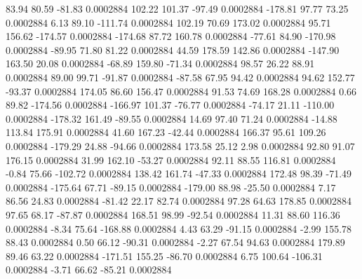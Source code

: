       83.94       80.59      -81.83     0.0002884
      102.22      101.37      -97.49     0.0002884
     -178.81       97.77       73.25     0.0002884
        6.13       89.10     -111.74     0.0002884
      102.19       70.69      173.02     0.0002884
       95.71      156.62     -174.57     0.0002884
     -174.68       87.72      160.78     0.0002884
      -77.61       84.90     -170.98     0.0002884
      -89.95       71.80       81.22     0.0002884
       44.59      178.59      142.86     0.0002884
     -147.90      163.50       20.08     0.0002884
      -68.89      159.80      -71.34     0.0002884
       98.57       26.22       88.91     0.0002884
       89.00       99.71      -91.87     0.0002884
      -87.58       67.95       94.42     0.0002884
       94.62      152.77      -93.37     0.0002884
      174.05       86.60      156.47     0.0002884
       91.53       74.69      168.28     0.0002884
        0.66       89.82     -174.56     0.0002884
     -166.97      101.37      -76.77     0.0002884
      -74.17       21.11     -110.00     0.0002884
     -178.32      161.49      -89.55     0.0002884
       14.69       97.40       71.24     0.0002884
      -14.88      113.84      175.91     0.0002884
       41.60      167.23      -42.44     0.0002884
      166.37       95.61      109.26     0.0002884
     -179.29       24.88      -94.66     0.0002884
      173.58       25.12        2.98     0.0002884
       92.80       91.07      176.15     0.0002884
       31.99      162.10      -53.27     0.0002884
       92.11       88.55      116.81     0.0002884
       -0.84       75.66     -102.72     0.0002884
      138.42      161.74      -47.33     0.0002884
      172.48       98.39      -71.49     0.0002884
     -175.64       67.71      -89.15     0.0002884
     -179.00       88.98      -25.50     0.0002884
        7.17       86.56       24.83     0.0002884
      -81.42       22.17       82.74     0.0002884
       97.28       64.63      178.85     0.0002884
       97.65       68.17      -87.87     0.0002884
      168.51       98.99      -92.54     0.0002884
       11.31       88.60      116.36     0.0002884
       -8.34       75.64     -168.88     0.0002884
        4.43       63.29      -91.15     0.0002884
       -2.99      155.78       88.43     0.0002884
        0.50       66.12      -90.31     0.0002884
       -2.27       67.54       94.63     0.0002884
      179.89       89.46       63.22     0.0002884
     -171.51      155.25      -86.70     0.0002884
        6.75      100.64     -106.31     0.0002884
       -3.71       66.62      -85.21     0.0002884

